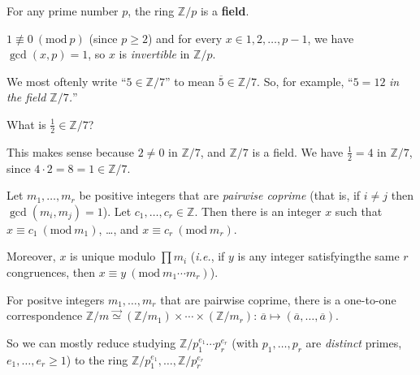 \documentclass{notes}
\begin{document}
\begin{cor}
  For any prime number $p$, the ring $\mathbb Z / p$ is a {\boldmath \bfseries field}.
\end{cor}

\begin{prf}
  $1 \nequiv 0\ (\mathrm{mod}\ p)$ (since $p \geq 2$) and for every $x \in 1, 2, \dots, p - 1$, we have $\gcd(x, p) = 1$, so $x$ is \textit{invertible} in $\mathbb Z / p$.
\end{prf}

\begin{rmk}
  We most oftenly write ``$5 \in \mathbb Z / 7$'' to mean $\overline 5 \in \mathbb Z / 7$.
  So, for example, ``$5 = 12$ \textit{in the field $\mathbb Z / 7$.}''
\end{rmk}

\begin{eg}
  What is $\frac{1}{2} \in \mathbb Z / 7$?

  This makes sense because $2 \neq 0$ in $\mathbb Z / 7$, and $\mathbb Z / 7$ is a field.
  We have $\frac{1}{2} = 4$ in $\mathbb Z / 7$, since $4 \cdot 2 = 8 = 1 \in \mathbb Z / 7$.
\end{eg}

\begin{thm}
  Let $m_1, \dots, m_r$ be positive integers that are \textit{pairwise coprime} (that is, if $i \neq j$ then $\gcd(m_i, m_j) = 1$).
  Let $c_1, \dots, c_r \in \mathbb Z$.
  Then there is an integer $x$ such that $x \equiv c_1\ (\mathrm{mod}\ m_1)$, \dots, and $x \equiv c_r\ (\mathrm{mod}\ m_r)$.

  Moreover, $x$ is unique modulo $\prod m_i$ (\textit{i.e.}, if $y$ is any integer satisfyingthe same $r$ congruences, then $x \equiv y\ (\mathrm{mod}\ m_1 \cdots m_r)$).
\end{thm}

\begin{cor}
  For positve integers $m_1, \dots, m_r$ that are pairwise coprime, there is a one-to-one correspondence $\mathbb Z / m \overset{\longrightarrow}{\simeq} (\mathbb Z / m_1) \times \cdots \times (\mathbb Z / m_r)$: $\overline a \mapsto (\overline a, \dots, \overline a)$.

  So we can mostly reduce studying $\mathbb Z / p_1^{e_1} \cdots p_r^{e_r}$ (with $p_1, \dots, p_r$ are \textit{distinct} primes, $e_1, \dots, e_r \geq 1$) to the ring $\mathbb Z / p_1^{e_1}, \dots, \mathbb Z / p_r^{e_r}$
\end{cor}
\end{document}

